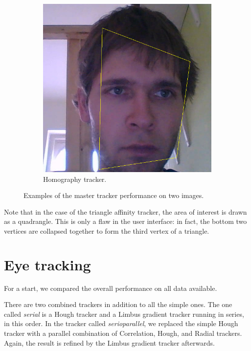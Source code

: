 \begin{figure}[t]
\begin{subfigure}[b]{0.49\textwidth}
	\end{subfigure}
	\begin{subfigure}[b]{0.49\textwidth}
		\centering \includegraphics[width=\linewidth]{img/res-face-persp.png} \caption{Homography tracker.} \label{i:res-face-persp}
	\end{subfigure}
	\caption{Examples of the master tracker performance on two images.}\label{i:res-face}
\end{figure}

Note that in the case of the triangle affinity tracker, the area of interest is drawn as a quadrangle.
This is only a flaw in the user interface: in fact, the bottom two vertices are collapsed together to form the third vertex of a triangle.

\section{Eye tracking}

For a start, we compared the overall performance on all data available.

There are two combined trackers in addition to all the simple ones.
The one called \textit{serial} is a Hough tracker and a Limbus gradient tracker running in series, in this order.
In the tracker called \textit{serioparallel}, we replaced the simple Hough tracker with a parallel combination of Correlation, Hough, and Radial trackers.
Again, the result is refined by the Limbus gradient tracker afterwards.

